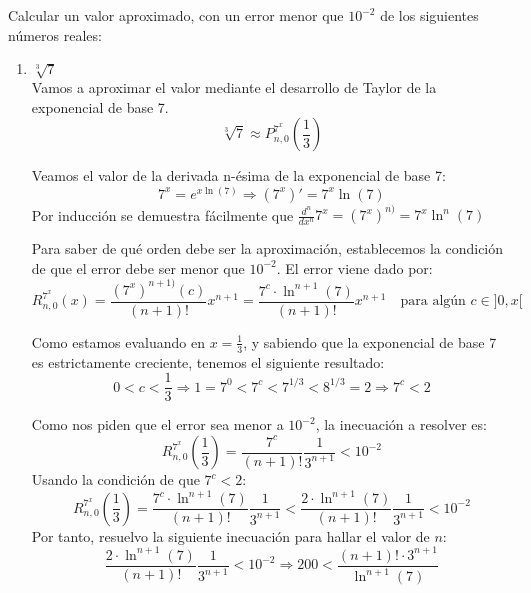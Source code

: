 \begin{ejercicio}
    Calcular un valor aproximado, con un error menor que $10^{-2}$ de los siguientes números reales:
    \begin{enumerate}
        \item $\sqrt[3]{7}$\\
        Vamos a aproximar el valor mediante el desarrollo de Taylor de la exponencial de base 7.
        $$\sqrt[3]{7}\approx P_{n, 0}^{7^x}\left(\frac{1}{3}\right)$$

        Veamos el valor de la derivada n-ésima de la exponencial de base 7:
        \begin{equation*}
            7^x = e^{x\ln(7)} \Longrightarrow (7^x)' = 7^x \ln(7)
        \end{equation*}
        Por inducción se demuestra fácilmente que $\frac{d^n}{dx^n} 7^x = (7^x)^{n)}=  7^x \ln^n(7)$

        Para saber de qué orden debe ser la aproximación, establecemos la condición de que el error debe ser menor que $10^{-2}$. El error viene dado por:
        \begin{equation*}
            R_{n,0}^{7^x}\left(x\right) = \frac{(7^x)^{n+1)}(c)}{(n+1)!}x^{n+1} = \frac{7^c \cdot \ln^{n+1} (7)}{(n+1)!}x^{n+1} \quad \text{para algún } c\in ]0, x[
        \end{equation*}

        Como estamos evaluando en $x=\frac{1}{3}$, y sabiendo que la exponencial de base 7 es estrictamente creciente, tenemos el siguiente resultado:
        \begin{equation*}
            0 < c < \frac{1}{3} \Longrightarrow 1 = 7^0 < 7^c < 7^{1/3} < 8^{1/3} = 2  \Longrightarrow 7^c < 2
        \end{equation*}

        Como nos piden que el error sea menor a $10^{-2}$, la inecuación a resolver es:
        \begin{equation*}
            R_{n,0}^{7^x}\left(\frac{1}{3}\right) = \frac{7^c}{(n+1)!}\frac{1}{3^{n+1}} < 10^{-2}
        \end{equation*}
        Usando la condición de que $7^c < 2$:
        \begin{equation*}
            R_{n,0}^{7^x}\left(\frac{1}{3}\right) = \frac{7^c \cdot \ln^{n+1} (7)}{(n+1)!}\frac{1}{3^{n+1}} < \frac{2 \cdot \ln^{n+1} (7)}{(n+1)!}\frac{1}{3^{n+1}}  < 10^{-2}
        \end{equation*}
        Por tanto, resuelvo la siguiente inecuación para hallar el valor de $n$:
        \begin{equation*}
            \frac{2\cdot \ln^{n+1} (7)}{(n+1)!}\frac{1}{3^{n+1}}  < 10^{-2} \Longrightarrow 200 < \frac{(n+1)! \cdot 3^{n+1}}{\ln^{n+1} (7)}
        \end{equation*}


\end{enumerate}
\end{ejercicio}
